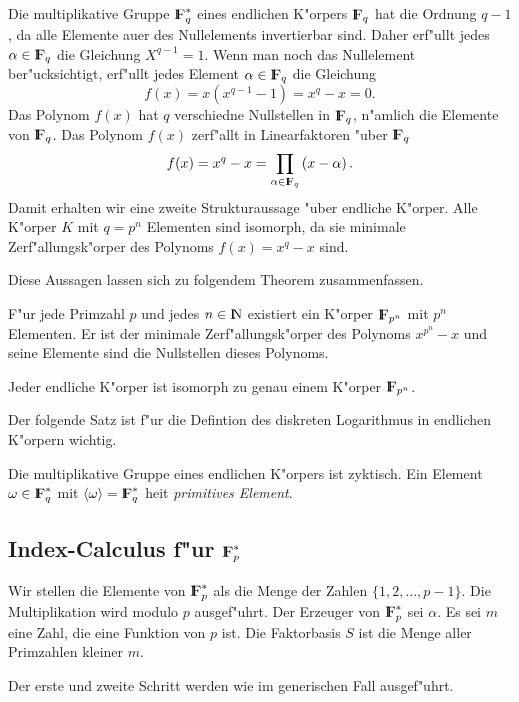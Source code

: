   Die multiplikative Gruppe $\koerper{q}^{*}$ eines endlichen K"orpers 
  $\koerper{q}$ hat die Ordnung $q-1$, da alle Elemente au\3er des
  Nullelements invertierbar sind. Daher erf"ullt jedes
  $\alpha\in\koerper{q}$ die Gleichung $X^{q-1}=1$. Wenn man noch das
  Nullelement ber"ucksichtigt, erf"ullt jedes Element 
  $\alpha\in\koerper{q}$ die Gleichung
  $$ f(x) = x\left( x^{q-1} - 1\right) = x^q - x = 0. $$
  Das Polynom $f(x)$ hat $q$ verschiedne Nullstellen in $\koerper{q}$,
  n"amlich die Elemente von $\koerper{q}$. Das Polynom $f(x)$ zerf"allt
  in Linearfaktoren "uber $\koerper{q}$
  $$ f(x) = x^q-x = \prod_{\alpha\in\koerper{q}} \left( x - \alpha \right). $$
  Damit erhalten wir eine zweite Strukturaussage "uber endliche K"orper.
  Alle K"orper $K$ mit $q=p^n$ Elementen sind isomorph, da sie
  minimale Zerf"allungsk"orper des Polynoms $f(x) = x^q - x$ sind.
  
  Diese Aussagen lassen sich zu folgendem Theorem zusammenfassen.
  \begin{theorem}
    F"ur jede Primzahl $p$ und jedes $n\in\N$ existiert ein K"orper 
    $\koerper{p^n}$ mit $p^n$ Elementen. Er ist der minimale 
    Zerf"allungsk"orper des Polynoms $x^{p^n}-x$ und seine Elemente sind die 
    Nullstellen dieses Polynoms. 

    Jeder endliche K"orper ist isomorph zu genau einem K"orper
    $\koerper{p^n}$.
  \end{theorem}
  Der folgende Satz ist f"ur die Defintion des diskreten Logarithmus in 
  endlichen K"orpern wichtig.
  \begin{satz} 
    Die multiplikative Gruppe eines endlichen K"orpers ist zyktisch. Ein 
    Element $\omega\in\koerper{q}^*$ mit 
    $\left<\omega\right>=\koerper{q}^{*}$ hei\3t {\em primitives Element}.
  \end{satz}
\subsection{Index-Calculus f"ur $\koerper{p}^*$}

Wir stellen die Elemente von $\koerper{p}^*$ als die Menge der Zahlen
$\{1,2,\ldots, p-1\}$. Die Multiplikation wird modulo $p$ ausgef"uhrt.
Der Erzeuger von $\koerper{p}^*$ sei $\alpha$. Es sei $m$ eine Zahl, die
eine Funktion von $p$ ist. Die Faktorbasis $S$ ist die Menge aller
Primzahlen kleiner $m$. 

Der erste und zweite Schritt werden wie im generischen Fall ausgef"uhrt.

